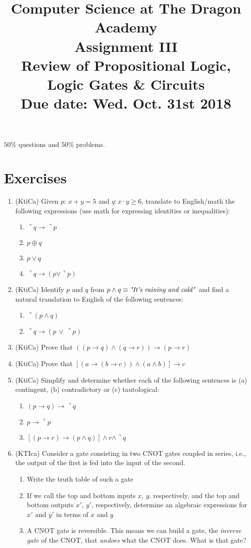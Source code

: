 \documentclass{article}
\title{
Computer Science at The Dragon Academy\\
Assignment III\\
Review of Propositional Logic, Logic Gates \& Circuits \\
{\bf Due date: Wed. Oct. 31st 2018}
}
\begin{document}
\maketitle
$50\%$ questions and $50\%$ problems. 
\section{Exercises}
\begin{enumerate}
\item (KtiCa) Given $p:\,x+y=5$ and $q:x\cdot y\geq 6$, translate to English/math the following expressions (use math for expressing identities or inequalities):
	\begin{enumerate}
		\item $\urcorner q \rightarrow \urcorner p$
		\item $p\oplus q$
		\item $p \vee q$
		\item $\urcorner q \rightarrow (p \vee \urcorner p)$
	\end{enumerate}
\item (KtiCa) Identify $p$ and $q$ from $p\wedge q\equiv\mbox{\textit{"It's raining and cold"}}$ and find a natural translation to English of the following sentences:
	\begin{enumerate}
		\item $\urcorner (p\wedge q)$
		\item $\urcorner q \rightarrow (p \,\vee\, \urcorner p)$
	\end{enumerate}
\item (KtiCa) Prove that $\left((p\rightarrow q)\wedge(q\rightarrow r)\right)\rightarrow (p\rightarrow r)$
\item (KtiCa) Prove that $\left[\left(a\rightarrow (b\rightarrow c)\right)\wedge(a\wedge b)\right]\rightarrow c$
\item (KtiCa) Simplify and determine whether each of the following sentences is (a) contingent, (b) contradictory or (c) tautological:
	\begin{enumerate}
		\item $(p\rightarrow q)\rightarrow \urcorner q$
		\item $p\rightarrow \urcorner p$
		\item $\left[\left(p\rightarrow r\right)\rightarrow (p\wedge q)\right]\wedge r\wedge \urcorner q$
	\end{enumerate}
\item (KTIca) Consider a gate consisting in two CNOT gates coupled in series, i.e., the output of the first is fed into the input of the second.
	\begin{enumerate}
	\item Write the truth table of such a gate
	\item If we call the top and bottom inputs $x,\,y$. respectively, and the top and bottom outputs $x',\,y'$, respectively, determine an algebraic expressions for $x'$ and $y'$ 
		in terms of $x$ and $y$
	\item A CNOT gate is reversible. This means we can build a gate, the \textit{inverse gate} of the CNOT, that \textit{undoes} what the CNOT does. What is that gate?
	\end{enumerate}

\end{enumerate}
\end{document}
